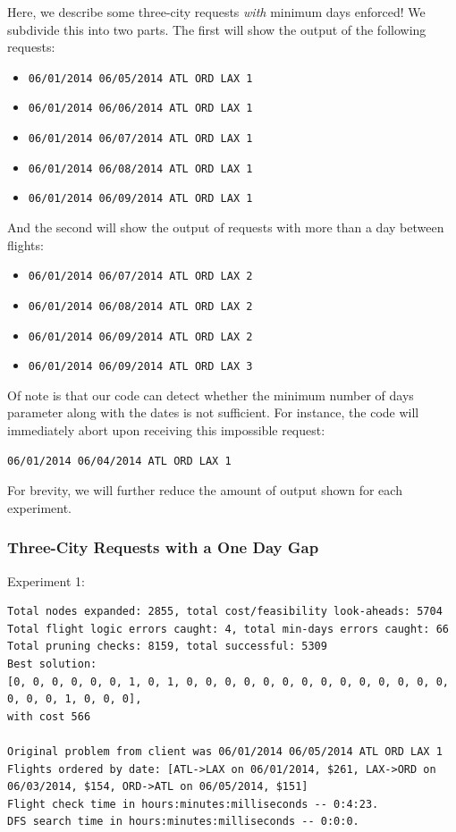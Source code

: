\documentclass{article}
\begin{document}
Here, we describe some three-city requests \emph{with} minimum days enforced! We subdivide this into two parts. The first will show the output of the
following requests:

\begin{itemize}[noitemsep]
    \item \texttt{06/01/2014 06/05/2014 ATL ORD LAX 1}
    \item \texttt{06/01/2014 06/06/2014 ATL ORD LAX 1}
    \item \texttt{06/01/2014 06/07/2014 ATL ORD LAX 1}
    \item \texttt{06/01/2014 06/08/2014 ATL ORD LAX 1}
    \item \texttt{06/01/2014 06/09/2014 ATL ORD LAX 1}
\end{itemize}

And the second will show the output of requests with more than a day between flights:

\begin{itemize}[noitemsep]
    \item \texttt{06/01/2014 06/07/2014 ATL ORD LAX 2}
    \item \texttt{06/01/2014 06/08/2014 ATL ORD LAX 2}
    \item \texttt{06/01/2014 06/09/2014 ATL ORD LAX 2}
    \item \texttt{06/01/2014 06/09/2014 ATL ORD LAX 3}
\end{itemize}

Of note is that our code can detect whether the minimum number of days parameter along with the dates is not sufficient. For instance, the code will
immediately abort upon receiving this impossible request:

\begin{verbatim}
06/01/2014 06/04/2014 ATL ORD LAX 1
\end{verbatim}

For brevity, we will further reduce the amount of output shown for each experiment.

\subsubsection{Three-City Requests with a One Day Gap}

Experiment 1:

\scriptsize
\begin{verbatim}
Total nodes expanded: 2855, total cost/feasibility look-aheads: 5704
Total flight logic errors caught: 4, total min-days errors caught: 66
Total pruning checks: 8159, total successful: 5309
Best solution:
[0, 0, 0, 0, 0, 0, 1, 0, 1, 0, 0, 0, 0, 0, 0, 0, 0, 0, 0, 0, 0, 0, 0, 0, 0, 0, 1, 0, 0, 0],
with cost 566

Original problem from client was 06/01/2014 06/05/2014 ATL ORD LAX 1
Flights ordered by date: [ATL->LAX on 06/01/2014, $261, LAX->ORD on 06/03/2014, $154, ORD->ATL on 06/05/2014, $151]
Flight check time in hours:minutes:milliseconds -- 0:4:23.
DFS search time in hours:minutes:milliseconds -- 0:0:0.
\end{verbatim}
\normalsize
\end{document}

